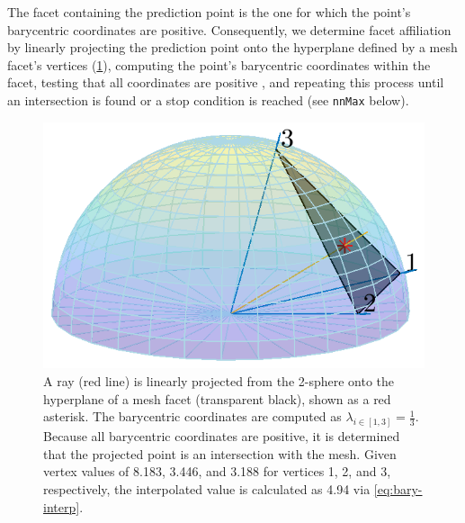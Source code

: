\documentclass[final,twocolumn,12pt]{elsarticle}
\newcommand{\outpt}{prediction}
\begin{document}
\begin{appendices}
The facet containing the \outpt{} point is the one for which the point's barycentric coordinates are positive. Consequently, we determine facet affiliation by linearly projecting the \outpt{} point onto the hyperplane defined by a mesh facet's vertices (\cref{fig:bary-interp}), computing the point's barycentric coordinates within the facet, testing that all coordinates are positive \cite{langerSphericalBarycentricCoordinates2006}, and repeating this process until an intersection is found or a stop condition is reached (see \texttt{nnMax} below).

\begin{figure}
    \centering
    \includegraphics[scale=1]{bary-interp.png}
    \caption{A ray (red line) is linearly projected from the 2-sphere onto the hyperplane of a mesh facet (transparent black), shown as a red asterisk. The barycentric coordinates are computed as $\lambda_{i \in [1,3]} = \frac{1}{3}$. Because all barycentric coordinates are positive, it is determined that the projected point is an intersection with the mesh. Given vertex values of \num{8.183}, \num{3.446}, and \num{3.188} for vertices 1, 2, and 3, respectively, the interpolated value is calculated as \num{4.94} via \cref{eq:bary-interp}.}
    \label{fig:bary-interp}
\end{figure}


\end{appendices}
\end{document}
